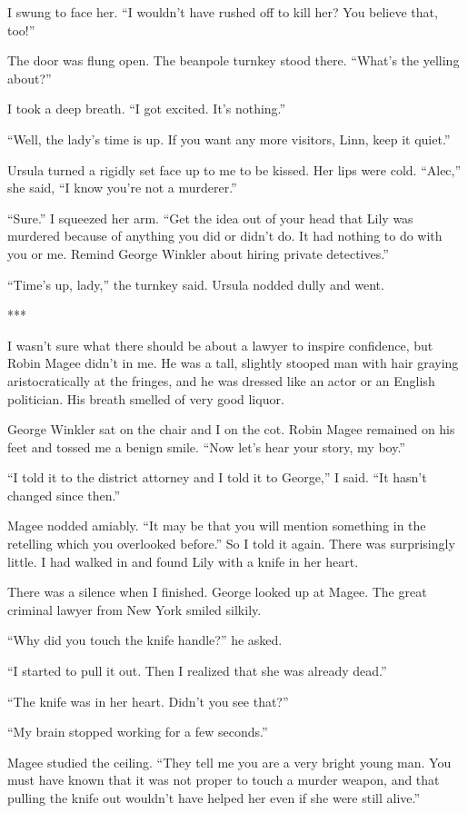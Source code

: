 \documentclass{novel}
\begin{document}
{I swung to face her. “I wouldn’t have rushed off to kill her? You believe that, too!”

The door was flung open. The beanpole turnkey stood there. “What’s the yelling about?”

I took a deep breath. “I got excited. It’s nothing.”

“Well, the lady’s time is up. If you want any more visitors, Linn, keep it quiet.”

Ursula turned a rigidly set face up to me to be kissed. Her lips were cold. “Alec,” she said, “I know you’re not a murderer.”

“Sure.” I squeezed her arm. “Get the idea out of your head that Lily was murdered because of anything you did or didn’t do. It had nothing to do with you or me. Remind George Winkler about hiring private detectives.”

“Time’s up, lady,” the turnkey said. Ursula nodded dully and went.

***

I wasn’t sure what there should be about a lawyer to inspire confidence, but Robin Magee didn’t in me. He was a tall, slightly stooped man with hair graying aristocratically at the fringes, and he was dressed like an actor or an English politician. His breath smelled of very good liquor.

George Winkler sat on the chair and I on the cot. Robin Magee remained on his feet and tossed me a benign smile. “Now let’s hear your story, my boy.”

“I told it to the district attorney and I told it to George,” I said. “It hasn’t changed since then.”

Magee nodded amiably. “It may be that you will mention something in the retelling which you overlooked before.” So I told it again. There was surprisingly little. I had walked in and found Lily with a knife in her heart.

There was a silence when I finished. George looked up at Magee. The great criminal lawyer from New York smiled silkily.

“Why did you touch the knife handle?” he asked.

“I started to pull it out. Then I realized that she was already dead.”

“The knife was in her heart. Didn’t you see that?”

“My brain stopped working for a few seconds.”

Magee studied the ceiling. “They tell me you are a very bright young man. You must have known that it was not proper to touch a murder weapon, and that pulling the knife out wouldn’t have helped her even if she were still alive.”

}
\end{document}
